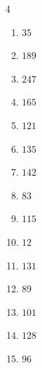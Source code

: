 \begin{multicols}{4}
\begin{enumerate}

  \item $35$


  \item $189$


  \item $247$


  \item $165$


  \item $121$


  \item $135$


  \item $142$


  \item $83$


  \item $115$


  \item $12$


\columnbreak %

  \item $131$


  \item $89$


  \item $101$


  \item $128$


  \item $96$



\end{enumerate}
\end{multicols}
